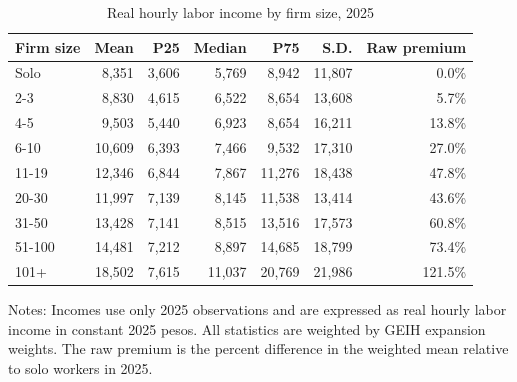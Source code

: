 \begin{table}[htbp]
  \centering
  \caption{Real hourly labor income by firm size, 2025}
  \label{tab:descriptive-income-size-2025}
  \small
  \begin{tabular}{lrrrrrr}
    \toprule
    Firm size & Mean & P25 & Median & P75 & S.D. & Raw premium \\
    \midrule
    Solo & 8,351 & 3,606 & 5,769 & 8,942 & 11,807 & 0.0\% \\
    2-3 & 8,830 & 4,615 & 6,522 & 8,654 & 13,608 & 5.7\% \\
    4-5 & 9,503 & 5,440 & 6,923 & 8,654 & 16,211 & 13.8\% \\
    6-10 & 10,609 & 6,393 & 7,466 & 9,532 & 17,310 & 27.0\% \\
    11-19 & 12,346 & 6,844 & 7,867 & 11,276 & 18,438 & 47.8\% \\
    20-30 & 11,997 & 7,139 & 8,145 & 11,538 & 13,414 & 43.6\% \\
    31-50 & 13,428 & 7,141 & 8,515 & 13,516 & 17,573 & 60.8\% \\
    51-100 & 14,481 & 7,212 & 8,897 & 14,685 & 18,799 & 73.4\% \\
    101+ & 18,502 & 7,615 & 11,037 & 20,769 & 21,986 & 121.5\% \\
    \bottomrule
  \end{tabular}
  \vspace{0.3em}
  \begin{minipage}{0.95\textwidth}
  \footnotesize
  Notes: Incomes use only 2025 observations and are expressed as real hourly labor income in constant 2025 pesos. All statistics are weighted by GEIH expansion weights. The raw premium is the percent difference in the weighted mean relative to solo workers in 2025.
  \end{minipage}
\end{table}
